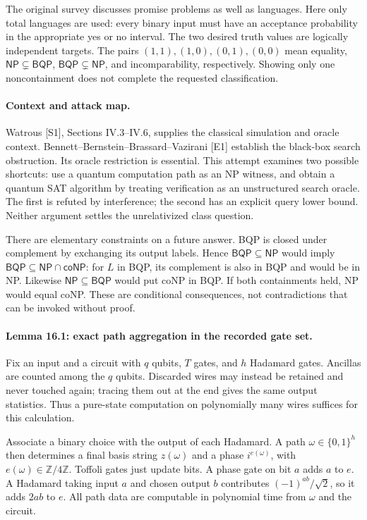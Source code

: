 \documentclass[11pt]{article}
\begin{document}
The original survey discusses promise problems as well as languages. Here
only total languages are used: every binary input must have an acceptance
probability in the appropriate yes or no interval. The two desired truth
values are logically independent targets. The pairs $(1,1),(1,0),(0,1),(0,0)$
mean equality, $\mathsf{NP}\subsetneq\mathsf{BQP}$,
$\mathsf{BQP}\subsetneq\mathsf{NP}$, and incomparability, respectively.
Showing only one noncontainment does not complete the requested classification.

\paragraph{Context and attack map.}
Watrous [S1], Sections IV.3--IV.6, supplies the classical simulation and
oracle context. Bennett--Bernstein--Brassard--Vazirani [E1] establish the
black-box search obstruction. Its oracle restriction is essential. This
attempt examines two possible shortcuts: use a quantum computation path as
an NP witness, and obtain a quantum SAT algorithm by treating verification
as an unstructured search oracle. The first is refuted by interference;
the second has an explicit query lower bound. Neither argument settles the
unrelativized class question.

There are elementary constraints on a future answer. BQP is closed under
complement by exchanging its output labels. Hence
$\mathsf{BQP}\subseteq\mathsf{NP}$ would imply
$\mathsf{BQP}\subseteq\mathsf{NP}\cap\mathsf{coNP}$: for $L$ in BQP,
its complement is also in BQP and would be in NP. Likewise
$\mathsf{NP}\subseteq\mathsf{BQP}$ would put coNP in BQP. If both
containments held, NP would equal coNP. These are conditional consequences,
not contradictions that can be invoked without proof.

\paragraph{Lemma 16.1: exact path aggregation in the recorded gate set.}
Fix an input and a circuit with $q$ qubits, $T$ gates, and $h$ Hadamard gates.
Ancillas are counted among the $q$ qubits. Discarded wires may instead be
retained and never touched again; tracing them out at the end gives the same
output statistics. Thus a pure-state computation on polynomially many wires
suffices for this calculation.

Associate a binary choice with the output of each Hadamard. A path
$\omega\in\{0,1\}^h$ then determines a final basis string $z(\omega)$ and
a phase $i^{e(\omega)}$, with $e(\omega)\in\mathbb Z/4\mathbb Z$.
Toffoli gates just update bits. A phase gate on bit $a$ adds $a$ to $e$.
A Hadamard taking input $a$ and chosen output $b$ contributes
$(-1)^{ab}/\sqrt2$, so it adds $2ab$ to $e$. All path data are computable
in polynomial time from $\omega$ and the circuit.
\end{document}
